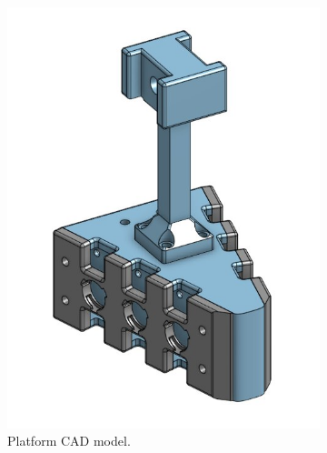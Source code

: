 \begin{figure}[ht]
    \centering
    \begin{subfigure}[b]{0.45\textwidth}
        \centering
        \includegraphics[height=0.3\textheight]{figures/platform-cad}
        \caption{Platform CAD model.}
    \end{subfigure}
    \hfill
    \begin{subfigure}[b]{0.45\textwidth}
        \centering

\end{subfigure}
\end{figure}
